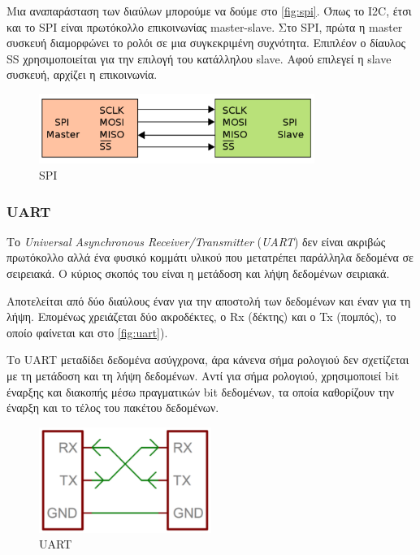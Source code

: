 Μια αναπαράσταση των διαύλων μπορούμε να δούμε στο \autoref{fig:spi}. Όπως το I2C, έτσι και το SPI είναι πρωτόκολλο επικοινωνίας master-slave. Στο SPI, πρώτα η master συσκευή διαμορφώνει το ρολόι σε μια συγκεκριμένη συχνότητα. Επιπλέον ο δίαυλος SS χρησιμοποιείται για την επιλογή του κατάλληλου slave. Αφού επιλεγεί η slave συσκευή, αρχίζει η επικοινωνία.

\begin{figure}[!ht]
	\centering
	\includegraphics[width=0.8\textwidth]{./images/chapter2/spi.png}
	\caption{SPI}
	\label{fig:spi}
\end{figure}

\subsubsection{UART}
\label{subsubsec:UART}

Το \textit{Universal Asynchronous Receiver/Transmitter} (\textit{UART}) δεν είναι ακριβώς πρωτόκολλο αλλά ένα φυσικό κομμάτι υλικού που μετατρέπει παράλληλα δεδομένα σε σειρειακά. Ο κύριος σκοπός του είναι η μετάδοση και λήψη δεδομένων σειριακά.

Αποτελείται από δύο διαύλους έναν για την αποστολή των δεδομένων και έναν για τη λήψη. Επομένως χρειάζεται δύο ακροδέκτες, ο Rx (δέκτης) και ο Tx (πομπός), το οποίο φαίνεται και στο \autoref{fig:uart}).

Το UART μεταδίδει δεδομένα ασύγχρονα, άρα κάνενα σήμα ρολογιού δεν σχετίζεται με τη μετάδοση και τη λήψη δεδομένων. Αντί για σήμα ρολογιού, χρησιμοποιεί bit έναρξης και διακοπής μέσω πραγματικών bit δεδομένων, τα οποία καθορίζουν την έναρξη και το τέλος του πακέτου δεδομένων.

\begin{figure}[!ht]
	\centering
	\includegraphics[width=0.5\textwidth]{./images/chapter2/uart.png}
	\caption{UART}
	\label{fig:uart}
\end{figure}
